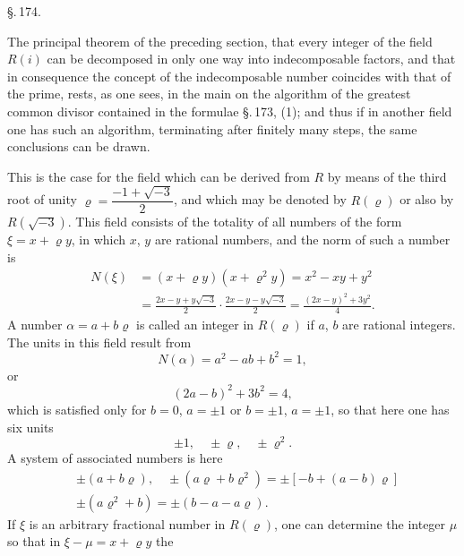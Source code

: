 
\begin{center}
\S.\,174.

\end{center}

The principal theorem of the preceding section, that every integer of the field $R(i)$ can be decomposed in only one way into indecomposable factors, and that in consequence the concept of the indecomposable number coincides with that of the prime, rests, as one sees, in the main on the algorithm of the greatest common divisor contained in the formulae \S.\,173, (1); and thus if in another field one has such an algorithm, terminating after finitely many steps, the same conclusions can be drawn.

This is the case for the field which can be derived from $R$ by means of the third root of unity $\varrho = \dfrac{-1+\sqrt{-3}}{2}$, and which may be denoted by $R(\varrho)$ or also by $R(\sqrt{-3})$. This field consists of the totality of all numbers of the form $\xi = x+\varrho y$, in which $x$, $y$ are rational numbers, and the norm of such a number is
\[
\begin{aligned}
N(\xi) &= (x+\varrho y)(x+\varrho^2 y) = x^2 - xy + y^2\\
&= \frac{2x-y+y\sqrt{-3}}{2}\cdot\frac{2x-y-y\sqrt{-3}}{2} = \frac{(2x-y)^2+3y^2}{4}.
\end{aligned}
\]
A number $\alpha = a+b\varrho$ is called an integer in $R(\varrho)$ if $a$, $b$ are rational integers. The units in this field result from
\[
N(\alpha) = a^2 - ab + b^2 = 1,
\]
or
\[
(2a-b)^2 + 3b^2 = 4,
\]
which is satisfied only for $b=0$, $a=\pm 1$ or $b=\pm 1$, $a=\pm 1$, so that here one has six units
\[
\pm 1,\quad \pm\varrho,\quad \pm\varrho^2.
\]
A system of associated numbers is here
\[
\begin{aligned}
&\pm(a+b\varrho),\quad \pm(a\varrho+b\varrho^2) = \pm[-b+(a-b)\varrho]\\
&\pm(a\varrho^2+b) = \pm(b-a-a\varrho).
\end{aligned}
\]
If $\xi$ is an arbitrary fractional number in $R(\varrho)$, one can determine the integer $\mu$ so that in $\xi-\mu = x+\varrho y$ the
